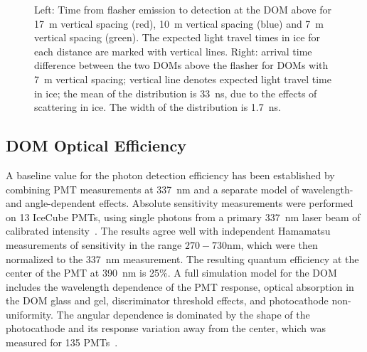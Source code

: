 \begin{figure}[!h]
  \captionsetup[subfigure]{labelformat=empty}
  \centering
  \caption{Left: Time from flasher emission to detection at the DOM above for 17~m vertical spacing
    (red), 10~m vertical spacing (blue) and 7~m vertical spacing
    (green). The expected light travel times in ice for each distance are marked with
    vertical lines. Right: arrival time difference between the two
    DOMs above the flasher for DOMs with 7~m vertical spacing; vertical line denotes expected light
    travel time in ice; the mean of the distribution is 33~ns, due to
    the effects of scattering in ice. The width of the distribution is 1.7~ns.}
  \label{fig:flashertiming}
\end{figure}

\subsection{\label{sec:domeff}DOM Optical Efficiency}

A baseline value for the photon detection efficiency has been established
by combining PMT measurements at 337~nm and a separate model of wavelength-
and angle-dependent effects.  Absolute sensitivity measurements were
performed on 13 IceCube PMTs, using single photons from a primary 337~nm laser beam of calibrated
intensity~\cite{ICECUBE:PMT}. The results agree well with independent
Hamamatsu measurements of sensitivity in the range $270-730$nm, which
were then normalized to the 337~nm measurement.  The resulting quantum
efficiency at the center of the PMT at 390~nm is 25\%.  A full
simulation model for the DOM includes the wavelength dependence of the PMT
response, optical absorption in the DOM glass and gel, discriminator
threshold effects, and photocathode non-uniformity.  The angular dependence is
dominated by the shape of the photocathode and its response variation away
from the center, which was measured for 135 PMTs~\cite{ICECUBE:PMT}.

